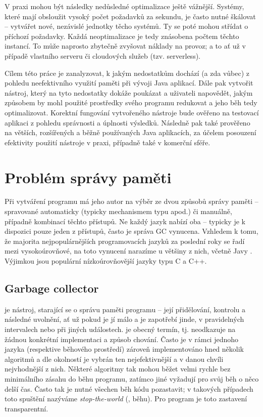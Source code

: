 V praxi mohou být následky nedůsledné optimalizace ještě vážnější. Systémy, které mají obsloužit vysoký počet požadavků za sekundu, je často nutné škálovat -- vytvářet nové, nezávislé jednotky těcho systémů. Ty se poté mohou střídat o příchozí požadavky. Každá neoptimalizace je tedy znásobena počtem těchto instancí. To může naprosto zbytečně zvyšovat náklady na provoz; a to ať už v případě vlastního serveru či cloudových služeb (tzv. serverless).

Cílem této práce je zanalyzovat, k jakým nedostatkům dochází (a zda vůbec) z pohledu neefektivního využití paměti při vývoji Java aplikací. Dále pak vytvořit nástroj, který na tyto nedostatky dokáže poukázat a uživateli napovědět, jakým způsobem by mohl použité prostředky svého programu redukovat a jeho běh tedy optimalizovat. Korektní fungování vytvořeného nástroje bude ověřeno na testovací aplikaci z pohledu správnosti a úplnosti výsledků. Následně pak také prověřeno na větších, rozšířených a běžně používaných Java aplikacích, za účelem posouzení efektivity použití nástroje v praxi, případně také v komerční sféře.






\chapter{Problém správy paměti}
Při vytváření programu má jeho autor na výběr ze dvou způsobů správy paměti -- spravované automaticky (typicky mechanismem typu  apod.) či manuálně, případně kombinací těchto přístupů. Ne každý jazyk nabízí oba -- typicky je k dispozici pouze jeden z přístupů, často je správa GC vynucena. Vzhledem k tomu, že majorita nejpopulárnějších programovacích jazyků za poslední roky se řadí mezi vysokoúrovňové, na toto vynucení  narazíme u většiny z nich, včetně Javy \cite{stackoverflowinsights}\cite{tiobeindex}. Výjimkou jsou populární nízkoúrovňovější jazyky typu C a C++.

\section{Garbage collector}
 je nástroj, starající se o správu paměti programu -- její přidělování, kontrolu a následné uvolnění, ať už pokud je jí málo a je zapotřebí jinde, v pravidelných intervalech nebo při jiných událostech.  je obecný termín, tj. neodkazuje na žádnou konkrétní implementaci a způsob chování. Často je v rámci jednoho jazyka (respektive běhového prostředí) zároveň implementováno hned několik algoritmů  a dle okolností je vybrán ten nejefektivnější a v danou chvíli nejvhodnější z nich. Některé algoritmy tak mohou běžet velmi rychle bez minimálního zásahu do běhu programu, zatímco jiné vyžadují pro svůj běh o něco delší čas. Často tak je nutné všechen běh kódu pozastavit; v takových případech toto spuštění  nazýváme \textit{stop-the-world} (, běhu). Pro program je toto zastavení transparentní.

